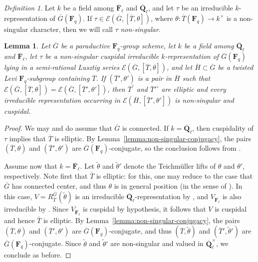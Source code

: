 \documentclass[reqno]{amsart}
\numberwithin{equation}{subsection}
\newcommand{\F}{\mathbf{F}}
\newcommand{\wt}[1]{\widetilde{#1}}
\newcommand{\Q}{\mathbf{Q}}
\newcommand{\ol}[1]{\overline{#1}}
\newcommand\cE{\mathcal{E}}
\newtheorem{lemma}[thm]{Lemma}
\theoremstyle{remark}
\newtheorem{defn}[thm]{Definition}
\numberwithin{equation}{subsection}
\numberwithin{figure}{subsection}
\begin{document}
\begin{defn}\label{defn:finite-group-ns-reps}
    Let $k$ be a field among $\ol\F_\ell$ and $\ol\Q_\ell$, and let $\tau$ be an irreducible $k$-representation of $\ol G(\F_q)$. If $\tau \in \cE(\ol G, [\ol T,\theta])$, where $\theta\colon \ol T(\F_q) \to k^\times$ is a non-singular character, then we will call $\tau$ \textit{non-singular}.
\end{defn}

\begin{lemma}\label{lemma:ns-dl-res-cuspidal}
    Let $\ol G$ be a paraductive $\F_q$-group scheme, let $k$ be a field among $\ol\Q_\ell$ and $\ol\F_\ell$, let $\tau$ be a non-singular cuspidal irreducible $k$-representation of $\ol G(\F_q)$ lying in a semi-rational Lusztig series $\cE(\ol G, [\ol T, \theta])$, and let $\ol H \subset \ol G$ be a twisted Levi $\F_q$-subgroup containing $\ol T$. If $(\ol T', \theta')$ is a pair in $\ol H$ such that $\cE(\ol G, [\ol T,\theta]) = \cE(\ol G, [\ol T',\theta'])$, then $\ol T^\circ$ and $\ol T'^\circ$ are elliptic and every irreducible representation occurring in $\cE(\ol H, [\ol T',\theta'])$ is non-singular and cuspidal.
\end{lemma}

\begin{proof}
    We may and do assume that $\ol G$ is connected. If $k = \ol\Q_\ell$, then cuspidality of $\tau$ implies that $\ol T$ is elliptic. By Lemma~\ref{lemma:non-singular-conjugacy}, the pairs $(\ol T, \theta)$ and $(\ol T', \theta')$ are $\ol G(\F_q)$-conjugate, so the conclusion follows from \cite[Theorem~8.3]{DL76}.

    Assume now that $k=\ol\F_\ell$. Let $\wt\theta$ and $\wt\theta'$ denote the Teichm\"uller lifts of $\theta$ and $\theta'$, respectively. Note first that $\ol T$ is elliptic: for this, one may reduce to the case that $\ol G$ has connected center, and thus $\theta$ is in general position (in the sense of \cite[Definition 5.15(ii)]{DL76}). In this case, $V = R_{\ol T}^{\ol G}(\wt\theta)$ is an irreducible $\ol\Q_\ell$-representation by \cite[Theorem~6.8]{DL76}, and $V_{\ol\F_\ell}$ is also irreducible by \cite[Corollaire~3.6]{Br90}. Since $V_{\ol\F_\ell}$ is cuspidal by hypothesis, it follows that $V$ is cuspidal and hence $\ol T$ is elliptic. By Lemma~\ref{lemma:non-singular-conjugacy}, the pairs $(\ol T, \theta)$ and $(\ol T', \theta')$ are $\ol G(\F_q)$-conjugate, and thus $(\ol T, \wt\theta)$ and $(\ol T', \wt\theta')$ are $\ol G(\F_q)$-conjugate. Since $\wt\theta$ and $\wt\theta'$ are non-singular and valued in $\ol\Q_\ell^\times$, we conclude as before.
\end{proof}
\end{document}
